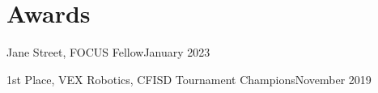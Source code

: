 \section{Awards}
\resumeSubHeadingListStart
    \AwardSubheading
    {Jane Street, FOCUS Fellow}{January 2023}
    
    \AwardSubheading
    {1st Place, VEX Robotics, CFISD Tournament Champions}{November 2019}
\resumeSubHeadingListEnd